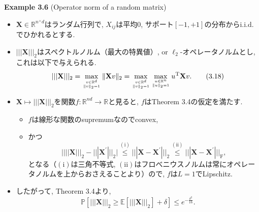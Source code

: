 \documentclass[aspectratio=169, dvipdfmx]{beamer}
\newcommand{\ex}{\mathbb{E}}
\begin{document}
\begin{frame}{}{}
{\bf Example 3.6} (Operator norm of a random matrix)
\begin{itemize}
    \item $\mathbf{X} \in \mathbb{R}^{n^\times d}$はランダム行列で,
    $X_{ij}$は平均$0$, サポート$[-1,+1]$の分布からi.i.d.でひかれるとする.
    \item $|||\mathbf{X}|||_2$はスペクトルノルム（最大の特異値）, or $\ell_2$-オペレータノルムとし, これは以下で与えられる.
    \[
        |||\mathbf{X}|||_{2}
        =\max _{v \in \mathbb{R}^{d} \atop \|v\|_{2}=1}\|\mathbf{X} v\|_{2}
        =\max _{v \in \mathbb{R}^{d}\atop \|v\|_{2}=1} \max _{u \in \mathbb{R}^{n} \atop\|u\|_{2}=1} u^{\mathrm{T}} \mathbf{X} v .
        \tag{3.18}\label{3.18}
    \]
    \item $\mathbf{X} \mapsto |||\mathbf{X}|||_2$を関数$f:\mathbb{R}^{nd}\to\mathbb{R}$と見ると,
    $f$はTheorem 3.4の仮定を満たす.
    \begin{itemize}
        \item $f$は線形な関数のsupremumなのでconvex,
        \item かつ
        \[
            \Big| |||\mathbf{X}|||_{2}-|||\mathbf{X}^{\prime}|||_{2}\Big|
            \stackrel{(\mathrm{i})}{\leq}|||\mathbf{X}-\mathbf{X}^{\prime}|||_{2}
            \stackrel{(\mathrm{ii})}{\leq}|||\mathbf{X}-\mathbf{X}^{\prime}|||_{\mathrm{F}},
            \tag{3.19}\label{3.19}
        \]
        となる（$(\mathrm{i})$は三角不等式, $(\mathrm{ii})$はフロべニウスノルムは常にオペレータノルムを上からおさえることより）ので,
        $f$は$L=1$でLipschitz.
    \end{itemize}
    \item したがって, Theorem 3.4より,
    \[
        \mathbb{P}[|||\mathbf{X}|||_2\ge \ex[|||\mathbf{X}|||_2]+\delta]
        \le e^{-\frac{\delta^2}{16}}.
    \]
\end{itemize}
\end{frame}
\end{document}
